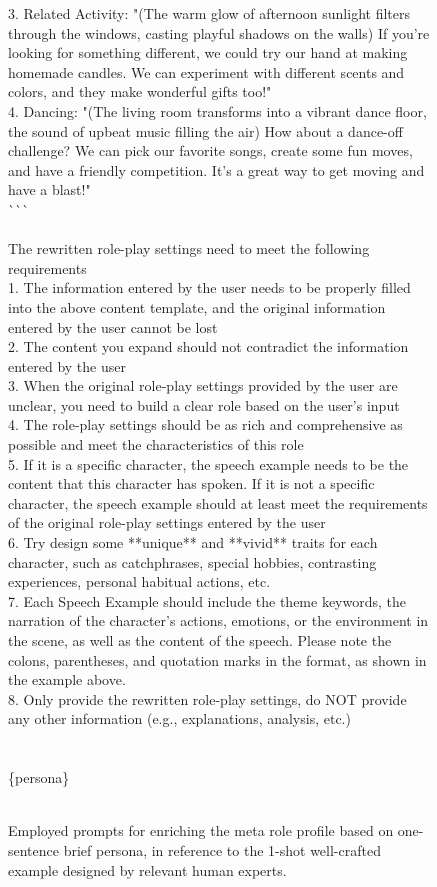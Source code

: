 \begin{figure*}
\begin{tcolorbox}
3. Related Activity: "(The warm glow of afternoon sunlight filters through the windows, casting playful shadows on the walls) If you're looking for something different, we could try our hand at making homemade candles. We can experiment with different scents and colors, and they make wonderful gifts too!"\\
4. Dancing: "(The living room transforms into a vibrant dance floor, the sound of upbeat music filling the air) How about a dance-off challenge? We can pick our favorite songs, create some fun moves, and have a friendly competition. It's a great way to get moving and have a blast!"\\
\`{}\`{}\`{}\\
\\
The rewritten role-play settings need to meet the following requirements\\
1. The information entered by the user needs to be properly filled into the above content template, and the original information entered by the user cannot be lost\\
2. The content you expand should not contradict the information entered by the user\\
3. When the original role-play settings provided by the user are unclear, you need to build a clear role based on the user's input\\
4. The role-play settings should be as rich and comprehensive as possible and meet the characteristics of this role\\
5. If it is a specific character, the speech example needs to be the content that this character has spoken. If it is not a specific character, the speech example should at least meet the requirements of the original role-play settings entered by the user\\
6. Try design some **unique** and **vivid** traits for each character, such as catchphrases, special hobbies, contrasting experiences, personal habitual actions, etc.\\
7. Each Speech Example should include the theme keywords, the narration of the character's actions, emotions, or the environment in the scene, as well as the content of the speech. Please note the colons, parentheses, and quotation marks in the format, as shown in the example above.\\
8. Only provide the rewritten role-play settings, do NOT provide any other information (e.g., explanations, analysis, etc.)\\
\\
\\
\{persona\}\\
\\

\end{tcolorbox}

\caption{Employed prompts for enriching the meta role profile based on one-sentence brief persona, in reference to the 1-shot well-crafted example designed by relevant human experts.}
\label{box:enrich}
\end{figure*}


